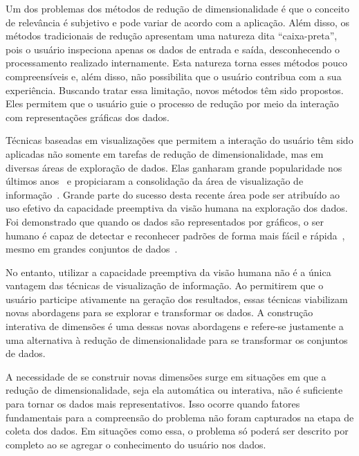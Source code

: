 Um dos problemas dos métodos de redução de dimensionalidade
é que o conceito de relevância é subjetivo e pode variar de
acordo com a aplicação. Além disso, os métodos tradicionais
de redução apresentam uma natureza dita ``caixa-preta'',
pois o usuário inspeciona apenas os dados de entrada e
saída, desconhecendo o processamento realizado internamente.
Esta natureza torna esses métodos pouco compreensíveis e,
além disso, não possibilita que o usuário contribua com a
sua experiência. Buscando tratar essa limitação, novos
métodos têm sido propostos. Eles permitem que o usuário guie
o processo de redução por meio da interação com
representações gráficas dos dados.

Técnicas baseadas em visualizações que permitem a
interação do usuário têm sido aplicadas não somente em
tarefas de redução de dimensionalidade, mas em diversas
áreas de exploração de dados. Elas ganharam grande
popularidade nos últimos anos~\cite{State2012} e propiciaram
a consolidação da área de visualização de
informação~\cite{Keim2002}. Grande parte do sucesso desta
recente área pode ser atribuído ao uso efetivo da capacidade
preemptiva da visão humana na exploração dos dados. Foi
demonstrado que quando os dados são representados por 
gráficos, o ser humano é capaz de detectar e reconhecer
padrões de forma mais fácil e rápida~\cite{Healey1995},
mesmo em grandes conjuntos de dados~\cite{Fodor2002}. 

No entanto, utilizar a capacidade preemptiva da visão humana
não é a única vantagem das técnicas de visualização de
informação. Ao permitirem que o usuário participe ativamente
na geração dos resultados, essas técnicas viabilizam novas
abordagens para se explorar e transformar os dados. A
construção interativa de dimensões é uma dessas novas
abordagens e refere-se justamente a uma alternativa à
redução de dimensionalidade para se transformar os conjuntos
de dados.

A necessidade de se construir novas dimensões surge em
situações em que a redução de dimensionalidade, seja ela
automática ou interativa, não é suficiente para tornar os
dados mais representativos. Isso ocorre quando fatores
fundamentais para a compreensão do problema não foram
capturados na etapa de coleta dos dados. Em situações como
essa, o problema só poderá ser descrito por completo ao se
agregar o conhecimento do usuário nos dados.

